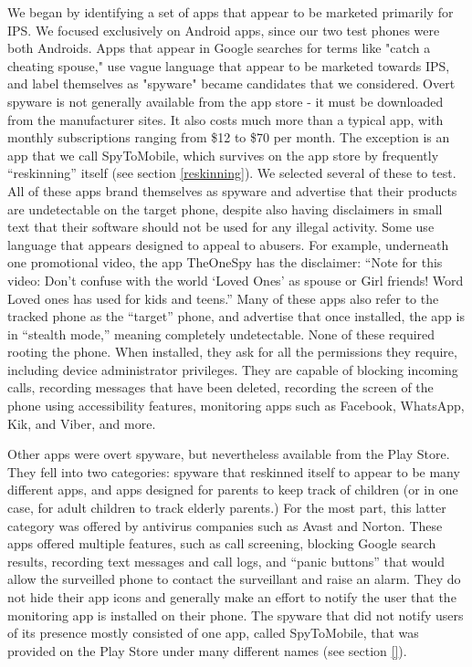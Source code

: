 \documentclass[acmtog]{acmart}
\begin{document}
We began by identifying a set of apps that appear to be 
marketed primarily for IPS. We focused exclusively on Android apps, since our 
two test phones were both Androids. Apps that appear in Google searches for 
terms like 
"catch a cheating spouse," use vague language that appear to be marketed 
towards IPS, and label themselves as "spyware" became candidates that we 
considered. Overt spyware is not generally available from the app store - it 
must be downloaded from the manufacturer sites. It also costs much more than a 
typical app, with monthly 
subscriptions ranging from \$12 to \$70 per month. The exception is an app that 
we call SpyToMobile, which survives on the app store by frequently 
``reskinning'' itself (see section \ref{reskinning}).  
We selected several of these to test. All of these apps brand themselves as 
spyware and advertise that their products are undetectable on the target phone, 
despite also having disclaimers in small text that their software should not be 
used for any illegal activity. Some use language that appears designed to 
appeal to abusers. For example, underneath one promotional 
video, the app TheOneSpy has the disclaimer: ``Note for this video: Don't 
confuse with the world `Loved Ones' as spouse or Girl friends! Word Loved ones 
has used for kids and teens.'' Many of these apps also refer to the tracked 
phone as the ``target'' phone, and advertise that once installed, the app is in 
``stealth mode,'' meaning completely undetectable. None of these required 
rooting the phone. When installed, they ask for all the permissions they 
require, including device administrator privileges. They are capable of 
blocking incoming calls, recording messages that have been deleted, recording 
the screen of the phone using accessibility features, monitoring apps such as 
Facebook, WhatsApp, Kik, and Viber, and more.

Other apps were overt spyware, but nevertheless available from the Play Store. 
They fell into two categories: spyware that reskinned itself to appear to be 
many different apps, and apps designed for parents to keep track of children 
(or in one case, for adult children to track elderly parents.) For the most 
part, this latter category was offered by antivirus companies such as Avast and 
Norton. These apps offered 
multiple features, such as call screening, blocking Google search results, 
recording text messages and call logs, and ``panic buttons'' that would allow 
the surveilled phone to contact the surveillant and raise an alarm. They do not 
hide their app icons and generally make an effort to notify the user that the 
monitoring app is installed on their phone. The spyware that did not notify 
users of its presence mostly consisted of one app, called SpyToMobile, that was 
provided on the Play Store under many different names (see section \ref{}). 
\end{document}
